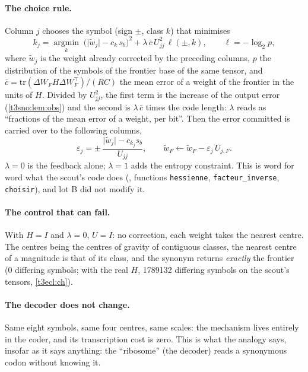 \paragraph{The choice rule.} Column $j$ chooses the symbol (sign $\pm$, class $k$) that minimises
\begin{equation}\label{t3sno:eq:choix}
k_j = \operatorname*{argmin}_{k}\; \bigl(\lvert \tilde w_j\rvert - c_k\, s_b\bigr)^2 + \lambda\, \bar c\, U_{jj}^2\, \ell(\pm, k),
\qquad \ell = -\log_2 p ,
\end{equation}
where $\tilde w_j$ is the weight already corrected by the preceding columns, $p$ the distribution of the symbols of the frontier base of the same tensor, and $\bar c = \mathrm{tr}(\Delta W_F H \Delta W_F^\top)/(RC)$ the mean error of a weight of the frontier in the units of $H$. Divided by $U_{jj}^2$, the first term is the increase of the output error (\cref{t3sno:lem:obs}) and the second is $\lambda\,\bar c$ times the code length: $\lambda$ reads as ``fractions of the mean error of a weight, per bit''. Then the error committed is carried over to the following columns,
\[
\varepsilon_j = \pm\,\frac{\lvert\tilde w_j\rvert - c_{k_j} s_b}{U_{jj}},
\qquad \tilde w_F \leftarrow \tilde w_F - \varepsilon_j\, U_{j,F} .
\]
$\lambda = 0$ is the feedback alone; $\lambda = 1$ adds the entropy constraint. This is word for word what the scout's code does (, functions \texttt{hessienne}, \texttt{facteur\_inverse}, \texttt{choisir}), and lot B did not modify it.

\paragraph{The control that can fail.} With $H = I$ and $\lambda = 0$, $U = I$: no correction, each weight takes the nearest centre. The centres being the centres of gravity of contiguous classes, the nearest centre of a magnitude is that of its class, and the synonym returns \emph{exactly} the frontier (0 differing symbols; with the real $H$, \num{1789132} differing symbols on the scout's tensors, \cref{t3ecl:ch}).

\paragraph{The decoder does not change.} Same eight symbols, same four centres, same scales: the mechanism lives entirely in the coder, and its transcription cost is zero. This is what the analogy says, insofar as it says anything: the ``ribosome'' (the decoder) reads a synonymous codon without knowing it.

